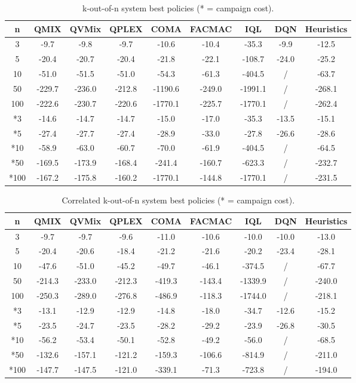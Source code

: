 \newpage
\begin{table}
\centering
\caption{k-out-of-n system best policies (* = campaign cost).}
\label{tab:koutofnresults}
\begin{tabular}{c|ccccccc|c}
\toprule
n & QMIX & QVMix & QPLEX & COMA & FACMAC & IQL & DQN & Heuristics \\
\midrule
3 & -9.7 & -9.8 & -9.7 & -10.6 & -10.4 & -35.3 & -9.9 & -12.5 \\
5 & -20.4 & -20.7 & -20.4 & -21.8 & -22.1 & -108.7 & -24.0 & -25.2 \\
10 & -51.0 & -51.5 & -51.0 & -54.3 & -61.3 & -404.5 & / & -63.7 \\
50 & -229.7 & -236.0 & -212.8 & -1190.6 & -249.0 & -1991.1 & / & -268.1 \\
100 & -222.6 & -230.7 & -220.6 & -1770.1 & -225.7 & -1770.1 & / & -262.4 \\
\midrule
*3 & -14.6 & -14.7 & -14.7 & -15.0 & -17.0 & -35.3 & -13.5 & -15.1 \\
*5 & -27.4 & -27.7 & -27.4 & -28.9 & -33.0 & -27.8 & -26.6 & -28.6 \\
*10 & -58.9 & -63.0 & -60.7 & -70.0 & -61.9 & -404.5 & / & -64.5 \\
*50 & -169.5 & -173.9 & -168.4 & -241.4 & -160.7 & -623.3 & / & -232.7 \\
*100 & -167.2 & -175.8 & -160.2 & -1770.1 & -144.8 & -1770.1 & / & -231.5 \\
\bottomrule
\end{tabular}
\end{table}



\begin{table}
\centering
\caption{Correlated k-out-of-n system best policies (* = campaign cost).}
\label{tab:correlatedkoutofnresults}
\begin{tabular}{c|ccccccc|c}
\toprule
n & QMIX & QVMix & QPLEX & COMA & FACMAC & IQL & DQN & Heuristics \\
\midrule
3 & -9.7 & -9.7 & -9.6 & -11.0 & -10.6 & -10.0 & -10.0 & -13.0 \\
5 & -20.4 & -20.6 & -18.4 & -21.2 & -21.6 & -20.2 & -23.4 & -28.1 \\
10 & -47.6 & -51.0 & -45.2 & -49.7 & -46.1 & -374.5 & / & -67.7 \\
50 & -214.3 & -233.0 & -212.3 & -419.3 & -143.4 & -1339.9 & / & -240.0 \\
100 & -250.3 & -289.0 & -276.8 & -486.9 & -118.3 & -1744.0 & / & -218.1 \\
\midrule
*3 & -13.1 & -12.9 & -12.9 & -14.8 & -18.0 & -34.7 & -12.6 & -15.2 \\
*5 & -23.5 & -24.7 & -23.5 & -28.2 & -29.2 & -23.9 & -26.8 & -30.5 \\
*10 & -56.2 & -53.4 & -50.1 & -52.8 & -49.2 & -56.0 & / & -68.5 \\
*50 & -132.6 & -157.1 & -121.2 & -159.3 & -106.6 & -814.9 & / & -211.0 \\
*100 & -147.7 & -147.5 & -121.0 & -339.1 & -71.3 & -723.8 & / & -194.0 \\
\bottomrule
\end{tabular}
\end{table}



